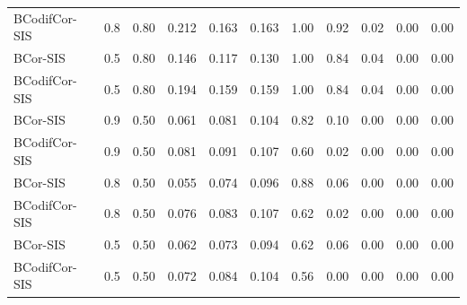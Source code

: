 \documentclass[11pt]{article}
\theoremstyle{definition}
\begin{document}
\begin{table}[!t]
{\begin{tabular}{lllrrrrrrrr}
BCodifCor-SIS & 0.8 & 0.80 & 0.212 & 0.163 & 0.163 & 1.00 & 0.92 & 0.02 & 0.00 & 0.00\\
BCor-SIS & 0.5 & 0.80 & 0.146 & 0.117 & 0.130 & 1.00 & 0.84 & 0.04 & 0.00 & 0.00\\
BCodifCor-SIS & 0.5 & 0.80 & 0.194 & 0.159 & 0.159 & 1.00 & 0.84 & 0.04 & 0.00 & 0.00\\
\addlinespace
BCor-SIS & 0.9 & 0.50 & 0.061 & 0.081 & 0.104 & 0.82 & 0.10 & 0.00 & 0.00 & 0.00\\
BCodifCor-SIS & 0.9 & 0.50 & 0.081 & 0.091 & 0.107 & 0.60 & 0.02 & 0.00 & 0.00 & 0.00\\
BCor-SIS & 0.8 & 0.50 & 0.055 & 0.074 & 0.096 & 0.88 & 0.06 & 0.00 & 0.00 & 0.00\\
BCodifCor-SIS & 0.8 & 0.50 & 0.076 & 0.083 & 0.107 & 0.62 & 0.02 & 0.00 & 0.00 & 0.00\\
BCor-SIS & 0.5 & 0.50 & 0.062 & 0.073 & 0.094 & 0.62 & 0.06 & 0.00 & 0.00 & 0.00\\
BCodifCor-SIS & 0.5 & 0.50 & 0.072 & 0.084 & 0.104 & 0.56 & 0.00 & 0.00 & 0.00 & 0.00\\
\bottomrule
\end{tabular}}
\end{table}

\begin{table}[!t]
\centering
\caption{BCodifCor-SIS and BCor-SIS performance for Gaussian random vectors.}
\label{tab:normal}
\end{table}
\FloatBarrier
\end{document}
